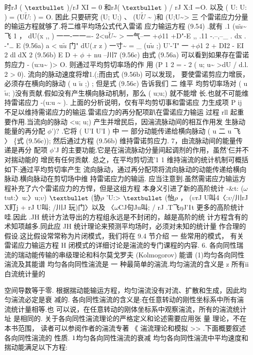 时rJ ( ${\rm •}$ )/rJ XI = 0 和rJ( ${\rm •}$ ) / rJ X:I =O. 以及 ( U: U: ) = (U$\tilde{U}$: ) = O. 困此.只要研究 (U; U;) 、 (U$\tilde{U}$ \textasciitilde{} )和 (U;U\textasciitilde{}> 三 个雷诺应力分量的输运方程就够了.将二维平均场公式代入雷诺 应力输运方程 (9.54) .就有 .1 (u$\tilde{u}$\textasciitilde{} 飞 1 ， dU(x ,, ) 一一-一一=- 2<u$\tilde{U}$\textasciitilde{} > 一气--一 +$\phi$11 +D"-E ,, .11 -.--,--\_ . dx . -"… E (9.56a) a < u$\tilde{u}$ 门" dU(.r z ) 一寸\textasciitilde{} = \_ (u$\tilde{u}$ ;) U'-'I" 一 +$\phi$1 2 + DI2 - EI 2 dl dX 2 (9.56b) E D + $\phi$ + nu --川7 (9.56c) 由式 (9.56a) 可以看到如果存在雷诺剪应力 - (u:u\textasciitilde{} )> O. 则通过平均剪切率场的作 用 (P 1 2 = - 2 ( u; u\textasciitilde{} >dU / d.l. 2 > 0). 流向的脉动速度将增1.(;而由式 (9.56b) 可以发现， 要使雷诺剪应力增辰，必须存在横向的脉动 ( u $\tilde{u}$ ;) ; 但是式 (9.56c) 告诉我们 二 维平 均剪切率场对 ( u$\tilde{u}$; )没有贡献.假如没有产生横向脉动机制，那么 ( u;u;) 就不能增 长.也就不可能维持雷诺应力 -(u:u \textasciitilde{} ). 上面的分析说明，仅有平均剪切事和雷诺应 力生成项 P ij 不足以维持需诺应力的输运.雷诺应力的再分配项趴在雷诺应力输运 过程 rll 起重要作用.当流向的脉动 <u; u;) 产生并增民后，因湍流脉动间的相互作用发 生脉动能量的再分配 $\phi$')? .它将 ( U'I U'I ) 中 一 部分动能传递给横向脉动 ( u 二 u 飞 〉 \{式 (9.56c)); 然后通过方程 (9.56b) 维持雷诺剪应力. 7，由流脉动间的能量传递是再分 配项 $\phi$'J 的主要功能.它是在湍流脉动分量间起调剂的作用，虽然'仨并不对揣动能的 增民有任何贡献. 总之，在平均剪切流'1 1 维持湍流的统计机制可概括如下:通过平均剪切率产生 流向脉动，通过再分配项将流向脉动的动能传递给横向脉动.横向脉动在剪切场中维 持雷诺应力的输运. 应当注意到.虽然需诺应力输运方程补充了六个雷诺应力的方悍，但是这组方程 本身义引进了新的高阶统计 -\&t: ($\omega$tut:〉u:〉u;$\upsilon$) ${\rm •}$ (协$\rho$ 'U:> ${\rm •}$ (怡$\rho$ ， ($\upsilon$rJ U叫4〈:$\upsilon$/川rJ X盯j + rJ U叫; /川J 玩)门〉以及 〈$\omega$CJ句Ju叫; / rJ .T飞$\eta$J'${\rm I}$t 更多的高阶统计哇.因此 .JH 统计方法导出的方程组永远是不封闭的，越是高阶的统 计方程含有的术知项越多.同此应 JH 统计理论来预测平均场时，必须对未知的统计量 作合理的假设.这比假设常常称为片闭模式，我们将在 9.4 节介绍 一 些常用的模式， 有关雷诺应力输运方程 H 闭模式的详细讨论是湍流的专门课程的内容. 6. 各向同性瑞流的瑞动能传输的串级理论和科尔莫戈罗夫 (Kolmogorov) 能谱 (1)均匀各向同性湍流及其能谱 均匀各向同性湍流是 一 种最简单的湍流.均匀湍流的含义是 z 所有ii白流统计量的

空间导数等于零. 根据揣动能输运方程，均匀湍流没有对流、扩散和生成，因此均匀湍流必定是衰 减的. 各向同性湍流的含义是:在任意转动的刚性坐标系中所有湍流统计量相等.也 可以说，在任意转动的刚体坐标系中观察湍流，所有的湍流统计址 是相同的. 关于各向同性湍流理论的严格定义和论述需要应用张 量 理论，不在本书范围， 读者可以参阅作者的湍流专著 《 湍流理论和模拟 >> .下面概要叙述各向同性湍流的 性质. ${\rm 1}$均匀各向同性湍流的衰减 均匀各向同性湍流中平均速度和揣动能满足以下方程:

